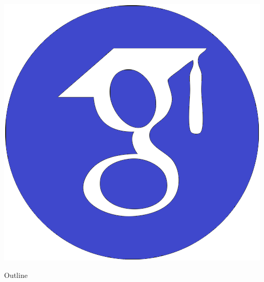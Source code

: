 \documentclass[11pt,a4paper,xcolor=dvipsnames, leqno]{beamer}
\begin{document}
\begin{frame}
\begin{center}
{\hspace*{0.3cm}
\href{https://scholar.google.es/citations?user=JegcEYwAAAAJ&hl=es&oi=ao}{\includegraphics[scale=0.12]{google_scholar.png}}
}
\end{center}

\end{frame}




\begin{without_headline}
    \begin{frame}{Outline} %
        \tableofcontents
    \end{frame}
\end{without_headline}

\end{document}
